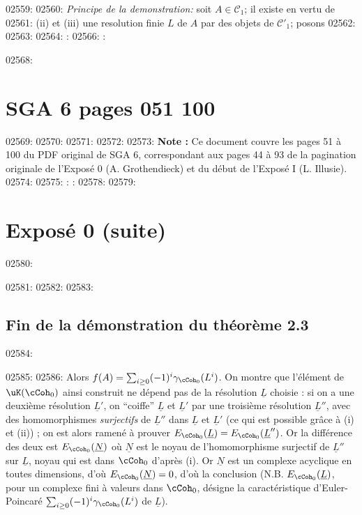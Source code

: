 02559: 
02560: \textit{Principe de la demonstration:} soit $A \in \mathcal{C}_1$; il existe en vertu de
02561: (ii) et (iii) une resolution finie $L$ de $A$ par des objets de $\mathcal{C}'_1$; posons
02562: 
02563: 
02564: : %
02566: : 
02568: \section*{SGA 6 pages 051 100}
02569: \setcounter{page}{51}
02570: 
02571: 
02572: 
02573: \noindent\textbf{Note :} Ce document couvre les pages 51 \`a 100 du PDF original de SGA 6, correspondant aux pages 44 \`a 93 de la pagination originale de l'Expos\'e 0 (A. Grothendieck) et du d\'ebut de l'Expos\'e I (L. Illusie).
02574: 
02575: : : 
02578: %
02579: \section*{Expos\'e 0 (suite)}
02580: 
02581: %
02582: 
02583: \subsection*{Fin de la d\'emonstration du th\'eor\`eme 2.3}
02584: 
02585: 
02586: Alors $f(A) = \sum_{i \geq 0} (-1)^i \gamma_{\cCoh_0}(L^i)$. On montre que l'\'el\'ement de $\uK(\cCoh_0)$ ainsi construit ne d\'epend pas de la r\'esolution $\underline{L}$ choisie : si on a une deuxi\`eme r\'esolution $\underline{L}'$, on ``coiffe'' $\underline{L}$ et $\underline{L}'$ par une troisi\`eme r\'esolution $\underline{L}''$, avec des homomorphismes \emph{surjectifs} de $\underline{L}''$ dans $\underline{L}$ et $\underline{L}'$ (ce qui est possible gr\^ace \`a (i) et (ii)) ; on est alors ramen\'e \`a prouver $E_{\cCoh_0}(\underline{L}) = E_{\cCoh_0}(\underline{L}'')$. Or la diff\'erence des deux est $E_{\cCoh_0}(\underline{N})$ o\`u $\underline{N}$ est le noyau de l'homomorphisme surjectif de $\underline{L}''$ sur $\underline{L}$, noyau qui est dans $\cCoh_0$ d'apr\`es (i). Or $\underline{N}$ est un complexe acyclique en toutes dimensions, d'o\`u $E_{\cCoh_0}(\underline{N}) = 0$, d'o\`u la conclusion (N.B. $E_{\cCoh_0}(\underline{L})$, pour un complexe fini \`a valeurs dans $\cCoh_0$, d\'esigne la caract\'eristique d'Euler-Poincar\'e $\sum_{i \geq 0} (-1)^i \gamma_{\cCoh_0}(L^i)$ de $\underline{L}$).
